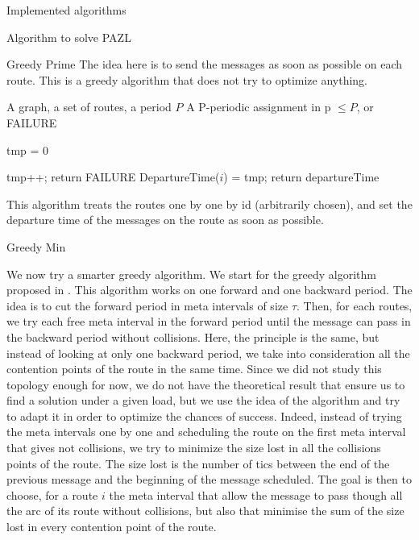 \documentclass[10pt]{article}
\begin{document}
\begin{section}{Implemented algorithms}
\begin{subsection}{Algorithm to solve PAZL }
  

   
  \begin{subsubsection}{Greedy Prime}
  The idea here is to send the messages as soon as possible on each route. This is a greedy algorithm that does not try to optimize anything.

   	\begin{algorithm}[H]
 	\caption{Greedy Prime}
 	\begin{algorithmic}
 	\REQUIRE A graph, a set of routes, a period $P$
	\ENSURE A P-periodic assignment in p $\leq P$, or FAILURE

	\STATE tmp = $0$
	
 	
 	\STATE tmp++;
	\STATE return FAILURE
	\ENDIF
 	\ENDWHILE
	\STATE DepartureTime($i$) = tmp;
 	\ENDFOR
	\STATE return departureTime
 	\end{algorithmic}
 	\end{algorithm}
	This algorithm treats the routes one by one by id (arbitrarily chosen), and set the departure time of the messages on the route as soon as possible.
  \end{subsubsection}
    \begin{subsubsection}{Greedy Min}
  
  We now try a smarter greedy algorithm. We start for the greedy algorithm proposed in \cite{Guir1806:Deterministic}.
  This algorithm works on one forward and one backward period. The idea is to cut the forward period in meta intervals of size $\tau$. Then, for each routes, we try each free meta interval in the forward period until the message can pass in the backward period without collisions. Here, the principle is the same, but instead of looking at only one backward period, we take into consideration all the contention points of the route in the same time. Since we did not study this topology enough for now, we do not have the theoretical result that ensure us to find a solution under a given load, but we use the idea of the algorithm and try to adapt it in order to optimize the chances of success. Indeed, instead of trying the meta intervals one by one and scheduling the route on the first meta interval that gives not collisions, we try to minimize the size lost in all the collisions points of the route.
 	The size lost is the number of tics between the end of the previous message and the beginning of the message scheduled.
	The goal is then to choose, for a route $i$ the meta interval that allow the message to pass though all the arc of its route without collisions, but also that minimise the sum of the size lost in every contention point of the route.
	

\end{subsubsection}
\end{subsection}
\end{section}
\end{document}
